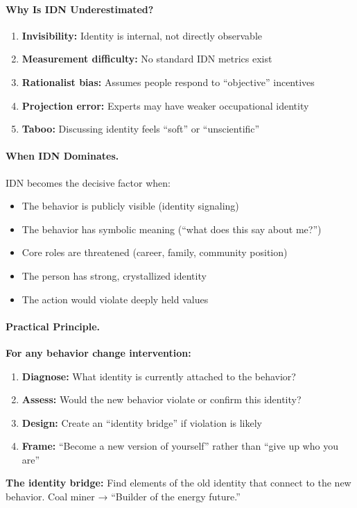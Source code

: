 \paragraph{Why Is IDN Underestimated?}

\begin{enumerate}
\item \textbf{Invisibility:} Identity is internal, not directly observable
\item \textbf{Measurement difficulty:} No standard IDN metrics exist
\item \textbf{Rationalist bias:} Assumes people respond to ``objective'' incentives
\item \textbf{Projection error:} Experts may have weaker occupational identity
\item \textbf{Taboo:} Discussing identity feels ``soft'' or ``unscientific''
\end{enumerate}

\paragraph{When IDN Dominates.}
IDN becomes the decisive factor when:

\begin{itemize}
\item The behavior is publicly visible (identity signaling)
\item The behavior has symbolic meaning (``what does this say about me?'')
\item Core roles are threatened (career, family, community position)
\item The person has strong, crystallized identity
\item The action would violate deeply held values
\end{itemize}

\paragraph{Practical Principle.}

\begin{tcolorbox}[colback=blue!5!white, colframe=blue!75!black, title=Principle 2: Identity First]
\textbf{For any behavior change intervention:}
\begin{enumerate}
\item \textbf{Diagnose:} What identity is currently attached to the behavior?
\item \textbf{Assess:} Would the new behavior violate or confirm this identity?
\item \textbf{Design:} Create an ``identity bridge'' if violation is likely
\item \textbf{Frame:} ``Become a new version of yourself'' rather than ``give up who you are''
\end{enumerate}
\textbf{The identity bridge:} Find elements of the old identity that connect 
to the new behavior. Coal miner → ``Builder of the energy future.''
\end{tcolorbox}


